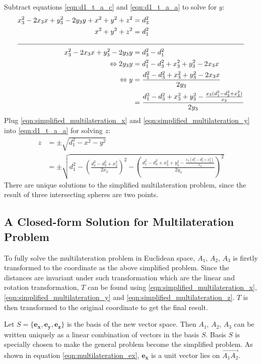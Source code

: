 \documentclass[\main/main.tex]{subfiles}
\begin{document}
Subtract equations \ref{eqn:d1_t_a_c} and \ref{eqn:d1_t_a_a} to solve for $y$:
\begin{equation}
    \begin{split}
        x_3^2  - 2x_3x + y_3^2 - 2y_3y + x^2 + y^2 + z^2 &= d_3^2 \\
        x^2 + y^2 + z^2 &= d_1^2 \\
        \cline{1-2}
        x_3^2  - 2x_3x + y_3^2 - 2y_3y &= d_3^2 - d_1^2\\
        \Leftrightarrow 2y_3y &= d_1^2 - d_3^2 + x_3^2 + y_3^2 - 2x_3x \\
        \Leftrightarrow y &= \frac{d_1^2 - d_3^2 + x_3^2 + y_3^2 - 2x_3x}{2y_3} \\
        &= \frac{d_1^2 - d_3^2 + x_3^2 + y_3^2 - \frac{x_3(d_1^2 - d_2^2 + x_2^2)}{x_2}}{2y_3}
    \end{split}
    \label{eqn:simplified_multilateration_y}
\end{equation}
Plug \ref{eqn:simplified_multilateration_x} and \ref{eqn:simplified_multilateration_y} into \ref{eqn:d1_t_a_a} for solving $z$:
\begin{equation}
    \begin{split}
        z &= \pm \sqrt{d_1^2 - x^2 - y^2} \\
        &= \pm \sqrt{d_1^2 - \left(\frac{d_1^2 - d_2^2 + x_2^2}{2x_2}\right)^2 - \left(\frac{d_1^2 - d_3^2 + x_3^2 + y_3^2 - \frac{x_3(d_1^2 - d_2^2 + x_2^2)}{x_2}}{2y_3}\right)^2}
    \end{split}
    \label{eqn:simplified_multilateration_z}
\end{equation}
There are unique solutions to the simplified multilateration problem, since the result of three intersecting spheres are two points.

\subsection{A Closed-form Solution for Multilateration Problem}
To fully solve the multilateration problem in Euclidean space, $A_1$, $A_2$, $A_3$ is firstly transformed to the coordinate as the above simplified problem. Since the distances are invariant under such transformation which are the linear and rotation transformation, $T$ can be found using \ref{eqn:simplified_multilateration_x}, \ref{eqn:simplified_multilateration_y} and \ref{eqn:simplified_multilateration_z}. $T$ is then transformed to the original coordinate to get the final result.

Let $S =\{\boldsymbol{e_x}, \boldsymbol{e_y}, \boldsymbol{e_z}\}$ is the basis of the new vector space. Then $A_1$, $A_2$, $A_3$ can be written uniquely as a linear combination of vectors in the basis $S$. Basis $S$ is specially chosen to make the general problem become the simplified problem. As shown in equation \ref{eqn:multilateration_ex}, $\boldsymbol{e_x}$ is a unit vector lies on $\overrightarrow{A_1A_2}$.
\end{document}
